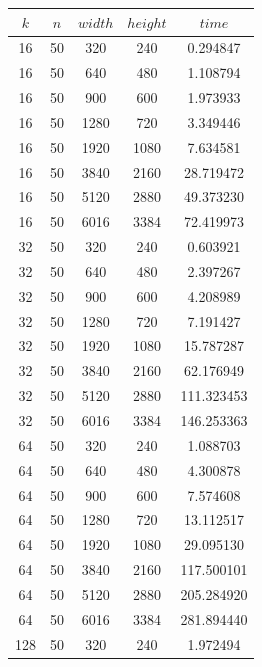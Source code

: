 \documentclass[11pt]{article}
\begin{document}
\begin{table}[H]
    \centering
    \label{dat:cpu}
    \begin{tabular}{c|c|c|c|c}
        $k$ & $n$ & $width$ & $height$ & $time$     \\
        \hline
        16  & 50  & 320     & 240      & 0.294847   \\
        16  & 50  & 640     & 480      & 1.108794   \\
        16  & 50  & 900     & 600      & 1.973933   \\
        16  & 50  & 1280    & 720      & 3.349446   \\
        16  & 50  & 1920    & 1080     & 7.634581   \\
        16  & 50  & 3840    & 2160     & 28.719472  \\
        16  & 50  & 5120    & 2880     & 49.373230  \\
        16  & 50  & 6016    & 3384     & 72.419973  \\
        32  & 50  & 320     & 240      & 0.603921   \\
        32  & 50  & 640     & 480      & 2.397267   \\
        32  & 50  & 900     & 600      & 4.208989   \\
        32  & 50  & 1280    & 720      & 7.191427   \\
        32  & 50  & 1920    & 1080     & 15.787287  \\
        32  & 50  & 3840    & 2160     & 62.176949  \\
        32  & 50  & 5120    & 2880     & 111.323453 \\
        32  & 50  & 6016    & 3384     & 146.253363 \\
        64  & 50  & 320     & 240      & 1.088703   \\
        64  & 50  & 640     & 480      & 4.300878   \\
        64  & 50  & 900     & 600      & 7.574608   \\
        64  & 50  & 1280    & 720      & 13.112517  \\
        64  & 50  & 1920    & 1080     & 29.095130  \\
        64  & 50  & 3840    & 2160     & 117.500101 \\
        64  & 50  & 5120    & 2880     & 205.284920 \\
        64  & 50  & 6016    & 3384     & 281.894440 \\
        128 & 50  & 320     & 240      & 1.972494   \\

\end{tabular}
\end{table}
\end{document}
